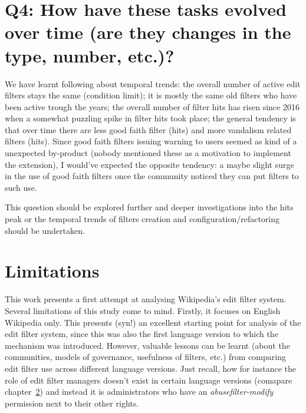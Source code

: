 \section{Q4: How have these tasks evolved over time (are they changes in the type, number, etc.)?}

We have learnt following about temporal trends:
the overall number of active edit filters stays the same (condition limit);
it is mostly the same old filters who have been active trough the years;
the overall number of filter hits has risen since 2016 when a somewhat puzzling spike in filter hits took place;
the general tendency is that over time there are less good faith filter (hits) and more vandalism related filters (hits).
Since good faith filters issuing warning to users seemed as kind of a unexpected by-product (nobody mentioned these as a motivation to implement the extension), %
I would've expected the opposite tendency: a maybe slight surge in the use of good faith filters once the community noticed they can put filters to such use.

This question should be explored further and deeper investigations into the hits peak or the temporal trends of filters creation and configuration/refactoring should be undertaken.


\begin{comment}
Claudia: * A focus on the Good faith policies/guidelines is a historical development. After the huge surge in edits Wikipedia experienced starting 2005 the community needed a means to handle these (and the proportional amount of vandalism). They opted for automatisation. Automated system branded a lot of good faith edits as vandalism, which drove new comers away. A policy focus on good faith is part of the intentions to fix this.
\end{comment}



\section{Limitations}

This work presents a first attempt at analysing Wikipedia's edit filter system.
Several limitations of this study come to mind.
Firstly, it focuses on English Wikipedia only.
This presents (syn!) an excellent starting point for analysis of the edit filter system, since this was also the first language version to which the mechanism was introduced.
However, valuable lessons can be learnt (about the communities, models of governance, usefulness of filters, etc.) from comparing edit filter use across different language versions.
Just recall, how for instance the role of edit filter managers doesn't exist in certain language versions (comapare chapter~\ref{}) and instead it is administrators who have an \emph{abusefilter-modify} permission next to their other rights.

